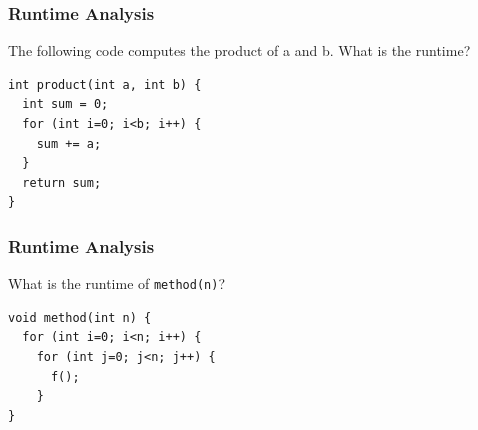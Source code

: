 \begin{frame}[fragile]
\frametitle{Runtime Analysis}
\begin{example}
The following code computes the product of a and b. What is the runtime?
\begin{lstlisting}
int product(int a, int b) {
  int sum = 0;
  for (int i=0; i<b; i++) {
    sum += a;
  }
  return sum;
}
\end{lstlisting}
\end{example}

\end{frame}

\begin{frame}[fragile]
\frametitle{Runtime Analysis}
\begin{example}
What is the runtime of \verb|method(n)|?
\begin{lstlisting}
void method(int n) {
  for (int i=0; i<n; i++) {
    for (int j=0; j<n; j++) {
      f();
    }
}
\end{lstlisting}
\end{example}

\end{frame}

